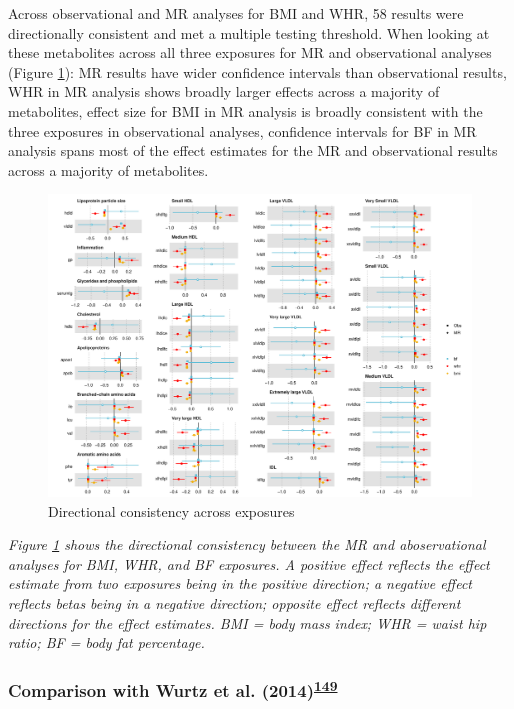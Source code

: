 \documentclass[11pt,twoside]{bristolthesis}
\newcommand{\bsmall}{\begin{small}}
\newcommand{\esmall}{\end{small}}
\begin{document}
Across observational and MR analyses for BMI and WHR, 58 results were directionally consistent and met a multiple testing threshold. When looking at these metabolites across all three exposures for MR and observational analyses (Figure \ref{fig:chapter5-figure-forestplot-directional-consistency-comparison}): MR results have wider confidence intervals than observational results, WHR in MR analysis shows broadly larger effects across a majority of metabolites, effect size for BMI in MR analysis is broadly consistent with the three exposures in observational analyses, confidence intervals for BF in MR analysis spans most of the effect estimates for the MR and observational results across a majority of metabolites.
\begin{figure}
\includegraphics[width=1\linewidth]{data/chapter5/figures/forestplot_sensitivity_directional_consistency_comparison} \caption{Directional consistency across exposures}\label{fig:chapter5-figure-forestplot-directional-consistency-comparison}
\end{figure}
\noindent 
\bsmall
\emph{Figure \ref{fig:chapter5-figure-forestplot-directional-consistency-comparison} shows the directional consistency between the MR and aboservational analyses for BMI, WHR, and BF exposures. A positive effect reflects the effect estimate from two exposures being in the positive direction; a negative effect reflects betas being in a negative direction; opposite effect reflects different directions for the effect estimates. BMI = body mass index; WHR = waist hip ratio; BF = body fat percentage.}
\esmall

\hypertarget{comparison-with-wurtz-et-al.-2014wurtz2014-1}{%
\subsubsection{\texorpdfstring{Comparison with Wurtz et al. (2014)\textsuperscript{\protect\hyperlink{ref-Wurtz2014}{149}}}{Comparison with Wurtz et al. (2014)149}}\label{comparison-with-wurtz-et-al.-2014wurtz2014-1}}
\end{document}
